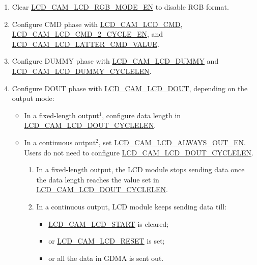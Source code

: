 \documentclass[main\_\_EN.tex]{subfiles}
\begin{document}
\begin{enumerate}
    \item Clear \hyperref[fielddesc:LCDCAMLCDRGBMODEEN]{LCD\_CAM\_LCD\_RGB\_MODE\_EN} to disable RGB format.
    \item Configure CMD phase with \hyperref[fielddesc:LCDCAMLCDCMD]{LCD\_CAM\_LCD\_CMD}, \hyperref[fielddesc:LCDCAMLCDCMD2CYCLEEN]{LCD\_CAM\_LCD\_CMD\_2\_CYCLE\_EN}, and \hyperref[fielddesc:LCDCAMLCDLATTERCMDVALUE]{LCD\_CAM\_LCD\_LATTER\_CMD\_VALUE}.
    \item Configure DUMMY phase with \hyperref[fielddesc:LCDCAMLCDDUMMY]{LCD\_CAM\_LCD\_DUMMY} and \hyperref[fielddesc:LCDCAMLCDDUMMYCYCLELEN]{LCD\_CAM\_LCD\_DUMMY\_CYCLELEN}.
    \item Configure DOUT phase with \hyperref[fielddesc:LCDCAMLCDDOUT]{LCD\_CAM\_LCD\_DOUT}, depending on the output mode:
    \begin{itemize}
        \item In a fixed-length output\hyperref[i2s-note-1]{$^1$}, configure data length in \hyperref[fielddesc:LCDCAMLCDDOUTCYCLELEN]{LCD\_CAM\_LCD\_DOUT\_CYCLELEN}.
        \item In a continuous output\hyperref[i2s-note-2]{$^2$}, set \hyperref[fielddesc:LCDCAMLCDALWAYSOUTEN]{LCD\_CAM\_LCD\_ALWAYS\_OUT\_EN}. Users do not need to configure \hyperref[fielddesc:LCDCAMLCDDOUTCYCLELEN]{LCD\_CAM\_LCD\_DOUT\_CYCLELEN}.
    \begin{tiplisting}
    \vspace{-2em}
    \begin{enumerate}
        \item \label{camlcdctrl-note-1} In a fixed-length output, the LCD module stops sending data once the data length reaches the value set in \hyperref[fielddesc:LCDCAMLCDDOUTCYCLELEN]{LCD\_CAM\_LCD\_DOUT\_CYCLELEN}.
        \item \label{camlcdctrl-note-2} In a continuous output, LCD module keeps sending data till:
            \begin{itemize}
                \item \hyperref[fielddesc:LCDCAMLCDSTART]{LCD\_CAM\_LCD\_START} is cleared;
                \item or \hyperref[fielddesc:LCDCAMLCDRESET]{LCD\_CAM\_LCD\_RESET} is set;
                \item or all the data in GDMA is sent out.
            \end{itemize}
    \end{enumerate}
    \end{tiplisting}
    \end{itemize}


\end{enumerate}
\end{document}
